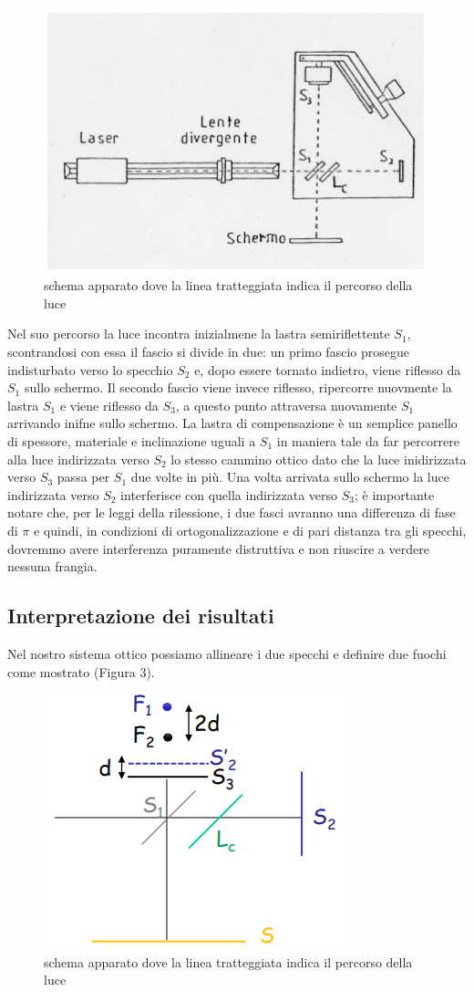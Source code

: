 \documentclass{article}
\begin{document}
\begin{figure}[h!]
  \centering
  \includegraphics[width=0.7\linewidth]{IM percorso luce}
  \caption{schema apparato dove la linea tratteggiata indica il percorso della luce}
\end{figure}


Nel suo percorso la luce incontra inizialmene la lastra semiriflettente $S_1$, scontrandosi con essa il fascio si divide in due: un primo fascio prosegue indisturbato verso lo specchio $S_2$ e, dopo essere tornato indietro, viene riflesso da $S_1$ sullo schermo. Il secondo fascio viene invece riflesso, ripercorre nuovmente la lastra $S_1$ e viene riflesso da $S_3$, a questo punto attraversa nuovamente $S_1$ arrivando inifne sullo schermo. La lastra di compensazione è un semplice panello di spessore, materiale e inclinazione uguali a $S_1$ in maniera tale da far percorrere alla luce indirizzata verso $S_2$ lo stesso cammino ottico dato che la luce inidirizzata verso $S_3$ passa per $S_1$ due volte in più.
Una volta arrivata sullo schermo la luce indirizzata verso $S_2$ interferisce con quella indirizzata verso $S_3$; è importante notare che, per le leggi della rilessione, i due fasci avranno una differenza di fase di $\pi$ e quindi, in condizioni di ortogonalizzazione e di pari distanza tra gli specchi, dovremmo avere interferenza puramente distruttiva e non riuscire a verdere nessuna frangia.


\subsection{Interpretazione dei risultati}
Nel nostro sistema ottico possiamo allineare i due specchi e definire due fuochi come mostrato (Figura 3).

\begin{figure}[h!]
  \centering
  \includegraphics[width=0.3\linewidth]{IM fuochi}
  \caption{schema apparato dove la linea tratteggiata indica il percorso della luce}
\end{figure}
\end{document}
